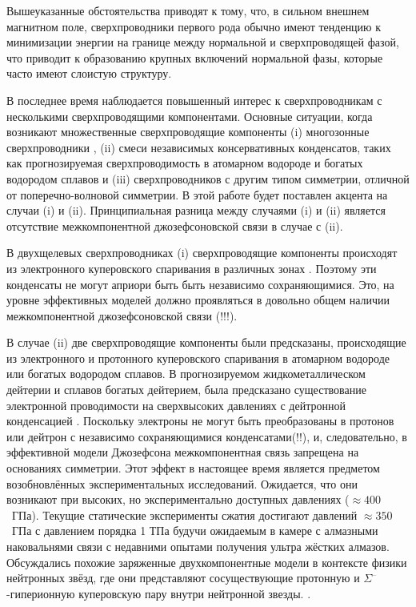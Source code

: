Вышеуказанные обстоятельства приводят к тому, что, в сильном внешнем магнитном 
поле, сверхпроводники первого рода обычно имеют тенденцию к минимизации 
энергии на границе между нормальной и сверхпроводящей фазой, что приводит к 
образованию крупных включений нормальной фазы, которые часто имеют слоистую 
структуру\cite{bib:4}. 

В последнее время наблюдается повышенный интерес к сверхпроводникам с 
несколькими сверхпроводящими компонентами. Основные ситуации, когда возникают 
множественные сверхпроводящие компоненты (i) многозонные сверхпроводники
\cite{bib:6,bib:7,bib:8,bib:9,bib:10,bib:11}, (ii) смеси независимых 
консервативных конденсатов, таких как прогнозируемая сверхпроводимость в 
атомарном водороде и богатых водородом сплавов \cite{bib:12,bib:13,bib:14} и 
(iii) сверхпроводников с другим типом симметрии, отличной от 
поперечно-волновой симметрии. В этой работе будет поставлен акцента на случаи 
(i) и (ii). Принципиальная разница между случаями (i) и (ii) является 
отсутствие межкомпонентной джозефсоновской связи в случае с (ii).

В двухщелевых сверхпроводниках (i) сверхпроводящие компоненты происходят из
электронного куперовского спаривания в различных зонах \cite{bib:6}. Поэтому 
эти конденсаты не могут априори быть быть независимо сохраняющимися. Это, на 
уровне эффективных моделей должно проявляться в довольно общем наличии 
межкомпонентной джозефсоновской связи (!!!).

В случае (ii) две сверхпроводящие компоненты были предсказаны, происходящие 
из электронного и протонного куперовского спаривания в атомарном водороде 
или богатых водородом сплавов. В прогнозируемом жидкометаллическом дейтерии и 
сплавов богатых дейтерием, была предсказано существование электронной 
проводимости на сверхвысоких давлениях с дейтронной конденсацией  
\cite{bib:12,bib:13,bib:14}. Поскольку электроны не могут быть преобразованы в 
протонов или дейтрон с независимо сохраняющимися конденсатами(!!), и, 
следовательно, в эффективной модели Джозефсона межкомпонентная связь запрещена 
на основаниях симметрии. Этот эффект в настоящее время является предметом 
возобновлённых экспериментальных исследований. Ожидается, что они возникают 
при высоких, но экспериментально доступных давлениях (\( \approx 400 \)~ГПа). 
Текущие статические эксперименты сжатия достигают давлений 
\( \approx 350 \)~ГПа с давлением порядка 1 ТПа будучи ожидаемым в камере с 
алмазными наковальнями связи с недавними опытами получения ультра жёстких 
алмазов. Обсуждались похожие заряженные двухкомпонентные модели в контексте 
физики нейтронных звёзд, где они представляют сосуществующие протонную и 
\( \Sigma^\text{--} \)-гиперионную куперовскую пару внутри нейтронной звезды.
\cite{bib:15}. 

